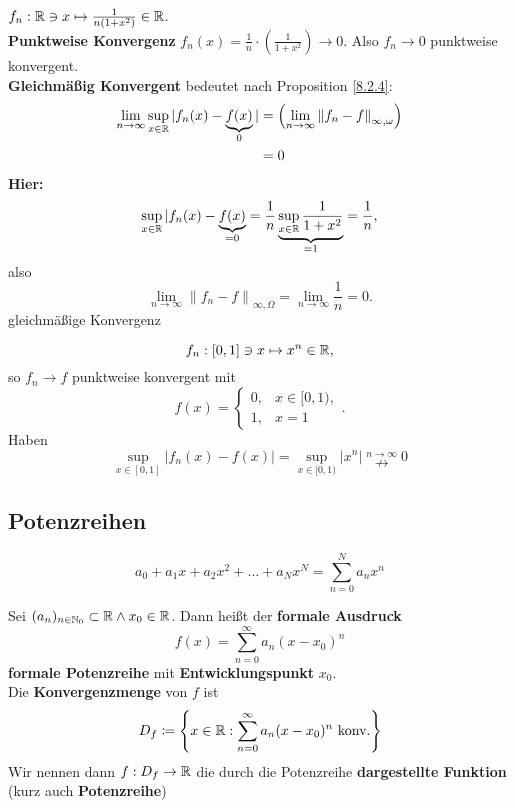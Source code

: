 \begin{subexample}
	$ f_n : \mathbb{R}  \ni x \mapsto \frac{ 1 }{ n(1 + x^2) } \in \mathbb{R}  $.\\
	\textbf{Punktweise Konvergenz} $ f_n(x) = \frac{ 1 }{ n } \cdot \left(  \frac{ 1 }{ 1 + x^2 } \right) \to 0 $.
	Also $ f_n \to 0 $ punktweise konvergent.\\
	\textbf{Gleichmäßig Konvergent} bedeutet nach Proposition \ref{8.2.4}:
	\begin{align*}
		\lim_{n \to \infty} \sup_{x \in \mathbb{R} } |f_n(x) - \underbrace{f(x)}_{0}| &= \left( \lim_{n \to \infty} \left\| f_n - f \right\|_{\infty, \omega} \right) \\
		~&= 0 \\
	\end{align*}
	\textbf{Hier:}
	\[
		\sup_{x \in \mathbb{R} } |f_n(x) - \underbrace{f(x)}_{=0} = \frac{ 1 }{ n } \underbrace{\sup_{x \in \mathbb{R}} \frac{ 1 }{ 1+x^2 }  }_{=1} = \frac{ 1 }{ n } ,
	\]
	also 
	\[
		\lim_{n \to \infty} \left\| f_n - f \right\|_{\infty, \Omega} = \lim_{n \to \infty} \frac{ 1 }{ n } = 0.
	\]
	gleichmäßige Konvergenz
\end{subexample}

\begin{subexample}
	\[
		f_n : [0, 1] \ni x \mapsto x^n \in \mathbb{R},
	\]
	so $ f_n \to f $ punktweise konvergent mit
	\[
		f(x) = \begin{cases}
			0, & x \in [0, 1),\\
			1, & x = 1
		\end{cases}.
	\]
	Haben 
	\[
		\sup_{x \in [0, 1]} | f_n(x) - f(x)| = \sup_{x \in [0, 1)} | x^n | \overset{n\to \infty}{\nrightarrow} 0
	\]
	
\end{subexample}

\subsection{Potenzreihen}
\[ a_0 + a_1x + a_2 x^2 + \dotsc + a_N x^N = \sum_{n=0}^{N} a_nx^n \]
\begin{subdefinition}
	Sei $ (a_n)_{n \in \mathbb{N}_0} \subset \mathbb{R} \wedge x_0 \in \mathbb{R}  $. Dann heißt der \textbf{formale Ausdruck}  
	\[
		f(x) = \sum_{n=0}^{\infty} a_n(x - x_0)^n
	\]
	\textbf{formale Potenzreihe} mit \textbf{Entwicklungspunkt} $ x_0 $.\\
	Die \textbf{Konvergenzmenge} von $ f $ ist
	\[
		D_f \coloneqq \left\{ x \in \mathbb{R} : \sum_{n=0}^{\infty} a_n(x-x_0)^n \text{ konv.}  \right\} 
	\]
	Wir nennen dann $ f: D_f \to \mathbb{R}  $ die durch die Potenzreihe \textbf{dargestellte Funktion} (kurz auch \textbf{Potenzreihe})
\end{subdefinition}

